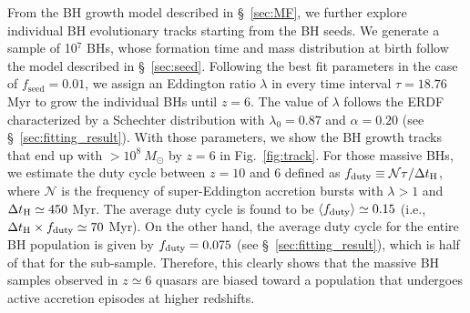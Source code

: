 \documentclass[twocolumn, twocolappendix]{aastex63}
\newcommand{\Msun}{M_\odot}
\newcommand{\tlife}{\tau}
\newcommand{\fseed}{f_\mathrm{seed}}
\newcommand{\red}[1]{\textcolor{red}{ #1}}
\newcommand{\blue}[1]{\textcolor{blue}{ #1}}
\begin{document}
\begin{CJK*}{UTF8}{gbsn}
From the BH growth model described in \S~\ref{sec:MF}, we further explore individual BH evolutionary tracks starting from the BH seeds.
We generate a sample of 10$^7$ BHs, whose formation time and mass distribution at birth follow the model described in \S~\ref{sec:seed}. 
Following the best fit parameters in the case of $\fseed = 0.01$,
we assign an Eddington ratio $\lambda$ in every time interval $\tlife=18.76$ Myr to grow the individual BHs until $z=6$. 
The value of $\lambda$ follows the ERDF characterized by a Schechter distribution with $\lambda_0=0.87$ and $\alpha=0.20$
(see \S~\ref{sec:fitting_result}).
With those parameters, we show the BH growth tracks that end up with $>10^8~\Msun$ by $z=6$ in Fig.~\ref{fig:track}. 
For those massive BHs, we estimate the duty cycle between $z=10$ and $6$ defined as $f_{\rm duty} \equiv \mathcal{N}\tlife/\Delta t_{\rm H}$, 
where $\mathcal{N}$ is the frequency of super-Eddington accretion bursts with $\lambda>1$ and $\Delta t_{\rm H}\simeq 450$ Myr.
The average duty cycle is found to be $\langle f_{\rm duty}\rangle \simeq 0.15$ (i.e., $\Delta t_{\rm H} \times f_{\rm duty} \simeq 70$ Myr).
On the other hand, the average duty cycle for the entire BH population is given by $f_{\rm duty}= 0.075$ 
(see \S~\ref{sec:fitting_result}), which is half of that for the sub-sample.
Therefore, this clearly shows that the massive BH samples observed in $z\simeq 6$ quasars are biased toward a population that
undergoes active accretion episodes at higher redshifts.



\end{CJK*}
\end{document}
